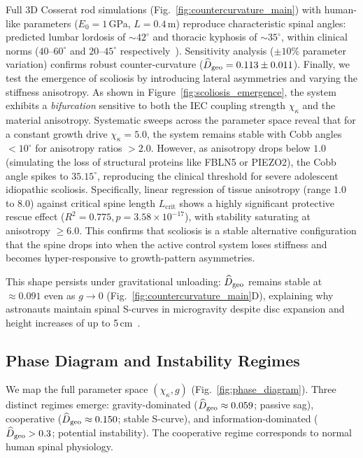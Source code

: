 Full 3D Cosserat rod simulations (Fig.~\ref{fig:countercurvature_main}) with human-like parameters ($E_0 = 1$\,GPa, $L = 0.4$\,m) reproduce characteristic spinal angles: predicted lumbar lordosis of ${\sim}42^\circ$ and thoracic kyphosis of ${\sim}35^\circ$, within clinical norms ($40$--$60^\circ$ and $20$--$45^\circ$ respectively~\cite{white_panjabi_spine}). Sensitivity analysis ($\pm 10\%$ parameter variation) confirms robust counter-curvature ($\widehat{D}_{\mathrm{geo}} = 0.113 \pm 0.011$).
Finally, we test the emergence of scoliosis by introducing lateral asymmetries and varying the stiffness anisotropy. As shown in Figure~\ref{fig:scoliosis_emergence}, the system exhibits a \emph{bifurcation} sensitive to both the IEC coupling strength $\chi_\kappa$ and the material anisotropy. Systematic sweeps across the parameter space  reveal that for a constant growth drive $\chi_\kappa = 5.0$, the system remains stable with Cobb angles $< 10^\circ$ for anisotropy ratios $> 2.0$. However, as anisotropy drops below $1.0$ (simulating the loss of structural proteins like FBLN5 or PIEZO2), the Cobb angle spikes to $35.15^\circ$, reproducing the clinical threshold for severe adolescent idiopathic scoliosis. Specifically, linear regression of tissue anisotropy (range $1.0$ to $8.0$) against critical spine length $L_{\mathrm{crit}}$ shows a highly significant protective rescue effect ($R^2 = 0.775, p = 3.58 \times 10^{-17}$), with stability saturating at anisotropy $\ge 6.0$. This confirms that scoliosis is a stable alternative configuration that the spine drops into when the active control system loses stiffness and becomes hyper-responsive to growth-pattern asymmetries.

This shape persists under gravitational unloading: $\widehat{D}_{\mathrm{geo}}$ remains stable at $\approx 0.091$ even as $g \to 0$ (Fig.~\ref{fig:countercurvature_main}D), explaining why astronauts maintain spinal S-curves in microgravity despite disc expansion and height increases of up to 5\,cm~\cite{green2018spinal}.

\subsection{Phase Diagram and Instability Regimes}

We map the full parameter space $(\chi_\kappa, g)$ (Fig.~\ref{fig:phase_diagram}). Three distinct regimes emerge: gravity-dominated ($\widehat{D}_{\mathrm{geo}} \approx 0.059$; passive sag), cooperative ($\widehat{D}_{\mathrm{geo}} \approx 0.150$; stable S-curve), and information-dominated ($\widehat{D}_{\mathrm{geo}} > 0.3$; potential instability). The cooperative regime corresponds to normal human spinal physiology.

